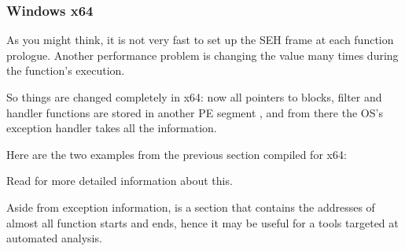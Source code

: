\subsubsection{Windows x64}

\label{SEH_win64}

As you might think, it is not very fast to set up the SEH frame at each function prologue.
Another performance problem is changing the 
 value many times during the function's execution.

So things are changed completely in x64: now all pointers to  blocks, filter and handler functions are stored
in another PE segment , 
and from there the \ac{OS}'s exception handler takes all the information.

Here are the two examples from the previous section compiled for x64:





Read \IgorSkochinsky for more detailed information about this.

Aside from exception information, 
is a section that contains the addresses of almost all function starts and ends,
hence it may be useful for a tools targeted at automated analysis.

